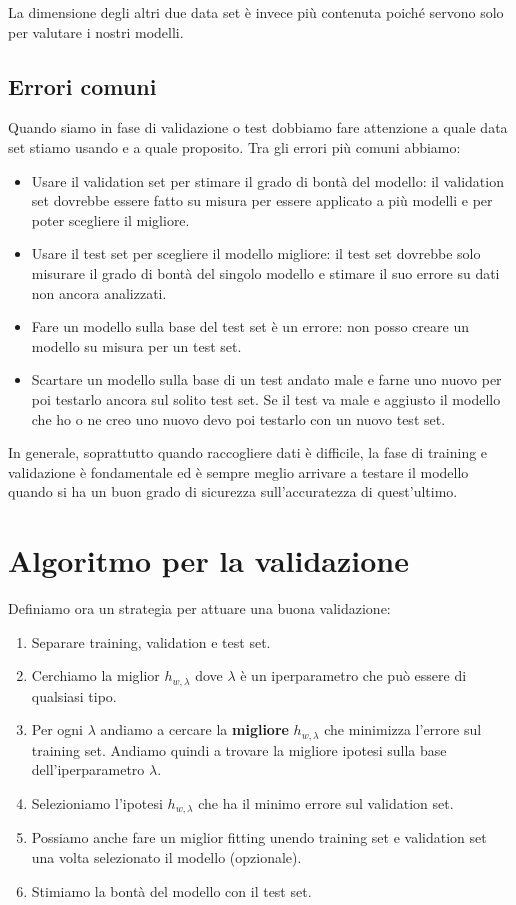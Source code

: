 La dimensione degli altri due data set \`e invece pi\`u contenuta poich\'e servono solo per valutare i nostri modelli.

\subsection{Errori comuni}
Quando siamo in fase di validazione o test dobbiamo fare attenzione a quale data set stiamo usando e a quale proposito. Tra
gli errori pi\`u comuni abbiamo:
\begin{itemize}
	\item Usare il validation set per stimare il grado di bont\`a del modello: il validation set dovrebbe essere fatto
	      su misura per essere applicato a pi\`u modelli e per poter scegliere il migliore.
	\item Usare il test set per scegliere il modello migliore: il test set dovrebbe solo misurare il grado di bont\`a del
	      singolo modello e stimare il suo errore su dati non ancora analizzati.
	\item Fare un modello sulla base del test set \`e un errore: non posso creare un modello su misura per un test set.
	\item Scartare un modello sulla base di un test andato male e farne uno nuovo per poi testarlo ancora sul solito test
	      set. Se il test va male e aggiusto il modello che ho o ne creo uno nuovo devo poi testarlo con un nuovo test set.
\end{itemize}
In generale, soprattutto quando raccogliere dati \`e difficile, la fase di training e validazione \`e fondamentale ed \`e
sempre meglio arrivare a testare il modello quando si ha un buon grado di sicurezza sull'accuratezza di quest'ultimo.

\section{Algoritmo per la validazione}
Definiamo ora un strategia per attuare una buona validazione:
\begin{enumerate}
	\item Separare training, validation e test set.
	\item Cerchiamo la miglior $h_{w, \lambda}$ dove $\lambda$ \`e un iperparametro che pu\`o essere di qualsiasi tipo.
	\item Per ogni $\lambda$ andiamo a cercare la \textbf{migliore} $h_{w, \lambda}$ che minimizza l'errore sul training
	      set. Andiamo quindi a trovare la migliore ipotesi sulla base dell'iperparametro $\lambda$.
	\item Selezioniamo l'ipotesi $h_{w, \lambda}$ che ha il minimo errore sul validation set.
	\item Possiamo anche fare un miglior fitting unendo training set e validation set una volta selezionato il modello
	      (opzionale).
	\item Stimiamo la bont\`a del modello con il test set.
\end{enumerate}


